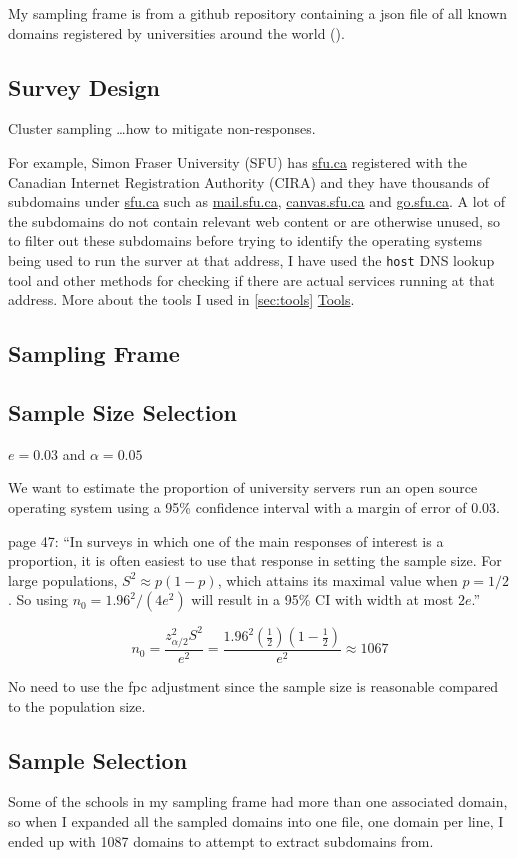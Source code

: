\documentclass{article}
\theoremstyle{definition}
\begin{document}
\begin{flushleft}
My sampling frame is from a github repository containing
a json file of all known domains registered by
universities around the world (\cite{Hipo}).

\subsection{Survey Design}
Cluster sampling \dots how to mitigate non-responses.

For example, Simon Fraser University (SFU) has \url{sfu.ca} registered with
the Canadian Internet Registration Authority (CIRA) and
they have thousands of subdomains under \url{sfu.ca} such as \url{mail.sfu.ca},
\url{canvas.sfu.ca} and \url{go.sfu.ca}. A lot of the subdomains do not
contain relevant web content or are otherwise unused, so to filter out these
subdomains before trying to identify the operating systems being
used to run the surver at that address, I have used the \texttt{host} DNS
lookup tool and other methods for checking if there are actual services running
at that address. More about the tools I used in \autoref{sec:tools} \hyperref[sec:tools]{Tools}.

\subsection{Sampling Frame}


\subsection{Sample Size Selection}
$e=0.03$ and $\alpha=0.05$ \cite{lohr2019}

We want to estimate the proportion of university servers
run an open source operating system using a 95\% confidence
interval with a margin of error of 0.03.

\cite{lohr2019} page 47:
``In surveys in which one of the main responses of interest
is a proportion, it is often easiest to use that response
in setting the sample size.
For large populations, $S^2 \approx p(1-p)$, which
attains its maximal value when $p=1/2$. So using
$n_0=1.96^2/(4e^2)$ will result in a 95\% CI with width at most
$2e$.''

$$
	n_0
	=
	\frac{
		z^2_{\alpha/2}S^2
	}{
		e^2
	}
	=
	\frac{
		1.96^2(\frac{1}{2})(1-\frac{1}{2})
	}{
		e^2
	}
	\approx
	1067
$$

No need to use the fpc adjustment since the sample size
is reasonable compared to the population size.


\subsection{Sample Selection}
Some of the schools in my sampling frame had more than one associated
domain, so when I expanded all the sampled domains into one file, one
domain per line, I ended up with 1087 domains to attempt to extract
subdomains from.


\end{flushleft}
\end{document}
